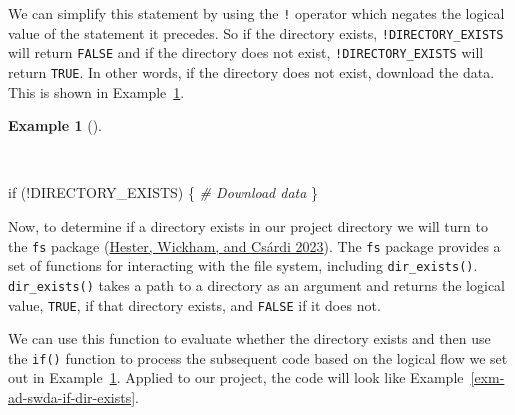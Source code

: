 \documentclass[
  letterpaper,
  DIV=11,
  numbers=noendperiod]{scrreport}
\newenvironment{Shaded}{\begin{snugshade}}{\end{snugshade}}
\newcommand{\CommentTok}[1]{\textcolor[rgb]{0.00,0.00,0.00}{\textit{#1}}}
\newcommand{\ControlFlowTok}[1]{\textcolor[rgb]{0.00,0.00,0.00}{#1}}
\newcommand{\NormalTok}[1]{\textcolor[rgb]{0.00,0.00,0.00}{#1}}
\newcommand{\SpecialCharTok}[1]{\textcolor[rgb]{0.00,0.00,0.00}{#1}}
\theoremstyle{definition}
\newtheorem{example}{Example}[chapter]
\theoremstyle{remark}
\begin{document}
We can simplify this statement by using the \texttt{!} operator which
negates the logical value of the statement it precedes. So if the
directory exists, \texttt{!DIRECTORY\_EXISTS} will return \texttt{FALSE}
and if the directory does not exist, \texttt{!DIRECTORY\_EXISTS} will
return \texttt{TRUE}. In other words, if the directory does not exist,
download the data. This is shown in
Example~\ref{exm-ad-if-dir-exists-simplified}.

\begin{example}[]\protect\hypertarget{exm-ad-if-dir-exists-simplified}{}\label{exm-ad-if-dir-exists-simplified}

~

\begin{Shaded}
\begin{Highlighting}[]
\ControlFlowTok{if}\NormalTok{ (}\SpecialCharTok{!}\NormalTok{DIRECTORY\_EXISTS) \{}
  \CommentTok{\# Download data}
\NormalTok{\}}
\end{Highlighting}
\end{Shaded}

\end{example}

Now, to determine if a directory exists in our project directory we will
turn to the \texttt{fs} package (\protect\hyperlink{ref-R-fs}{Hester,
Wickham, and Csárdi 2023}). The \texttt{fs} package provides a set of
functions for interacting with the file system, including
\texttt{dir\_exists()}. \texttt{dir\_exists()} takes a path to a
directory as an argument and returns the logical value, \texttt{TRUE},
if that directory exists, and \texttt{FALSE} if it does not.

We can use this function to evaluate whether the directory exists and
then use the \texttt{if()} function to process the subsequent code based
on the logical flow we set out in
Example~\ref{exm-ad-if-dir-exists-simplified}. Applied to our project,
the code will look like Example~\ref{exm-ad-swda-if-dir-exists}.
\end{document}
